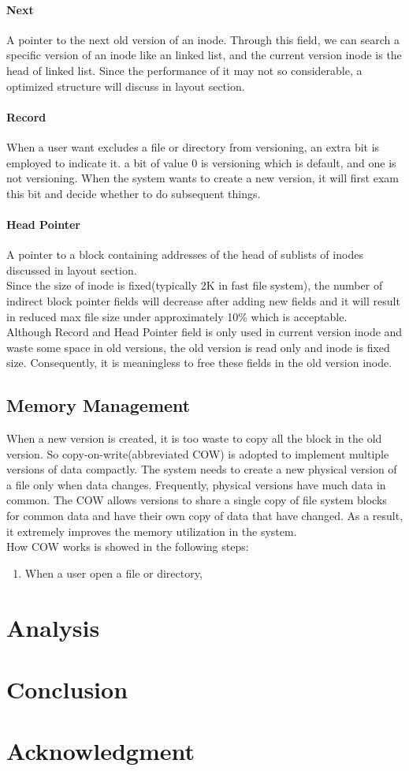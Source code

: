 \paragraph{Next}A pointer to the next old version of an inode. Through this field, we can search a specific version of an inode like an linked list, and the current version inode is the head of linked list. Since the performance of it may not so considerable, a optimized structure will discuss in layout section.
\paragraph{Record}When a user want excludes a file or directory from versioning, an extra bit is employed to indicate it. a bit of value 0 is versioning which is default, and one is not versioning. When the system wants to create a new version, it will first exam this bit and decide whether to do subsequent things.
\paragraph{Head Pointer}A pointer to a block containing addresses of the head of sublists of inodes discussed in layout section. \\[1em]
Since the size of inode  is fixed(typically 2K in fast file system), the number of indirect block pointer fields will decrease after adding new fields and it will result in reduced max file size under approximately 10\% which is acceptable.\\[1em]
Although Record and Head Pointer field is only used in current version inode and waste some space in old versions, the old version is read only and inode is fixed size. Consequently, it is meaningless to free these fields in the old version inode.
\subsection{Memory Management}
When a new version is created, it is too waste to copy all the block in the old version. So copy-on-write(abbreviated COW) is adopted to implement multiple versions of data compactly. The system needs to create a new physical version of a file only when data changes. Frequently, physical versions have much data in common. The COW allows versions to share a single copy of file system blocks for common data and have their own copy of data that have changed. As a result, it extremely improves the memory utilization in the system.\\[1em]How COW works is showed in the following steps:
\begin{enumerate}
\item When a user open a file or directory,
\end{enumerate}
\section{Analysis}
\section{Conclusion}
\section{Acknowledgment}

